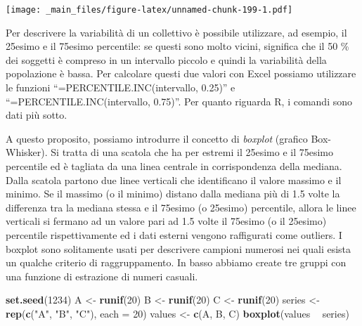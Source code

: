 \documentclass[a4paper,12pt,oneside]{book}
\newenvironment{Shaded}{\begin{snugshade}}{\end{snugshade}}
\newcommand{\KeywordTok}[1]{\textcolor[rgb]{0.13,0.29,0.53}{\textbf{#1}}}
\newcommand{\DataTypeTok}[1]{\textcolor[rgb]{0.13,0.29,0.53}{#1}}
\newcommand{\DecValTok}[1]{\textcolor[rgb]{0.00,0.00,0.81}{#1}}
\newcommand{\FloatTok}[1]{\textcolor[rgb]{0.00,0.00,0.81}{#1}}
\newcommand{\StringTok}[1]{\textcolor[rgb]{0.31,0.60,0.02}{#1}}
\newcommand{\OperatorTok}[1]{\textcolor[rgb]{0.81,0.36,0.00}{\textbf{#1}}}
\newcommand{\NormalTok}[1]{#1}
\theoremstyle{definition}
\theoremstyle{definition}
\theoremstyle{definition}
\theoremstyle{remark}
\begin{document}
\texttt{[image: \_main\_files/figure-latex/unnamed-chunk-199-1.pdf]}

Per descrivere la variabilità di un collettivo è possibile utilizzare,
ad esempio, il 25esimo e il 75esimo percentile: se questi sono molto
vicini, significa che il 50 \% dei soggetti è compreso in un intervallo
piccolo e quindi la variabilità della popolazione è bassa. Per calcolare
questi due valori con Excel possiamo utilizzare le funzioni
``=PERCENTILE.INC(intervallo, 0.25)'' e ``=PERCENTILE.INC(intervallo,
0.75)''. Per quanto riguarda R, i comandi sono dati più sotto.

\begin{Shaded}
\end{Shaded}

A questo proposito, possiamo introdurre il concetto di \emph{boxplot}
(grafico Box-Whisker). Si tratta di una scatola che ha per estremi il
25esimo e il 75esimo percentile ed è tagliata da una linea centrale in
corrispondenza della mediana. Dalla scatola partono due linee verticali
che identificano il valore massimo e il minimo. Se il massimo (o il
minimo) distano dalla mediana più di 1.5 volte la differenza tra la
mediana stessa e il 75esimo (o 25esimo) percentile, allora le linee
verticali si fermano ad un valore pari ad 1.5 volte il 75esimo (o il
25esimo) percentile rispettivamente ed i dati esterni vengono
raffigurati come outliers. I boxplot sono solitamente usati per
descrivere campioni numerosi nei quali esista un qualche criterio di
raggruppamento. In basso abbiamo create tre gruppi con una funzione di
estrazione di numeri casuali.

\begin{Shaded}
\begin{Highlighting}[]
\KeywordTok{set.seed}\NormalTok{(}\DecValTok{1234}\NormalTok{)}
\NormalTok{A <-}\StringTok{ }\KeywordTok{runif}\NormalTok{(}\DecValTok{20}\NormalTok{)}
\NormalTok{B <-}\StringTok{ }\KeywordTok{runif}\NormalTok{(}\DecValTok{20}\NormalTok{)}
\NormalTok{C <-}\StringTok{ }\KeywordTok{runif}\NormalTok{(}\DecValTok{20}\NormalTok{)}
\NormalTok{series <-}\StringTok{ }\KeywordTok{rep}\NormalTok{(}\KeywordTok{c}\NormalTok{(}\StringTok{"A"}\NormalTok{, }\StringTok{"B"}\NormalTok{, }\StringTok{"C"}\NormalTok{), }\DataTypeTok{each =} \DecValTok{20}\NormalTok{)}
\NormalTok{values <-}\StringTok{ }\KeywordTok{c}\NormalTok{(A, B, C)}
\KeywordTok{boxplot}\NormalTok{(values }\OperatorTok{~}\StringTok{ }\NormalTok{series)}
\end{Highlighting}
\end{Shaded}
\end{document}
